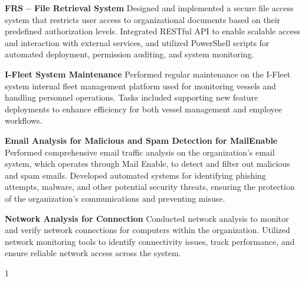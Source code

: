 \documentclass[lighthipster]{simplehipstercv}
\begin{document}
\begin{paracol}{2}
\begin{description}
\item{\textbf{FRS – File Retrieval System}}  
\newline
Designed and implemented a secure file access system that restricts user access to organizational documents based on their predefined authorization levels. Integrated RESTful API to enable scalable access and interaction with external services, and utilized PowerShell scripts for automated deployment, permission auditing, and system monitoring.
\item{\textbf{I-Fleet System Maintenance}}  
\newline
 Performed regular maintenance on the I-Fleet system internal fleet management platform used for monitoring vessels and handling personnel operations. Tasks included supporting new feature deployments to enhance efficiency for both vessel management and employee workflows.
\item{\textbf{Email Analysis for Malicious and Spam Detection for MailEnable}}  \newline
Performed comprehensive email traffic analysis on the organization's email system, which operates through Mail Enable, to detect and filter out malicious and spam emails. Developed automated systems for identifying phishing attempts, malware, and other potential security threats, ensuring the protection of the organization’s communications and preventing misuse.
\item{\textbf{Network Analysis for Connection}}  \newline
Conducted network analysis to monitor and verify network connections for computers within the organization. Utilized network monitoring tools to identify connectivity issues, track performance, and ensure reliable network access across the system.
\end{description}

%
%
%
\end{paracol}{1}
\end{document}
